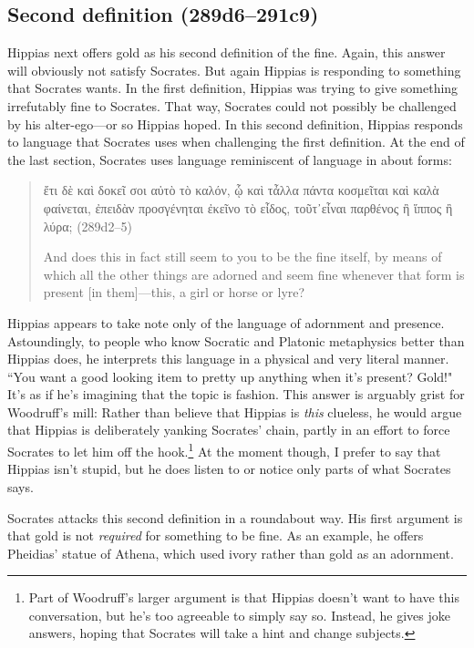 \documentclass[12pt]{article}
\begin{document}

\subsection{Second definition (289d6--291c9)}

Hippias next offers gold as his second definition of the fine.  Again, this answer will obviously not satisfy Socrates.  But again Hippias is responding to something that Socrates wants.  In the first definition, Hippias was trying to give something irrefutably fine to Socrates.  That way, Socrates could not possibly be challenged by his alter-ego---or so Hippias hoped.  In this second definition, Hippias responds to language that Socrates uses when challenging the first definition. At the end of the last section, Socrates uses language reminiscent of language in  about forms:

\begin{quote}
    {\g ἔτι δὲ καὶ δοκεῖ σοι αὐτὸ τὸ καλόν, ᾧ καὶ τἆλλα πάντα κοσμεῖται καὶ καλὰ φαίνεται, ἐπειδὰν προσγένηται ἐκεῖνο τὸ εἶδος, τοῦτ᾽εἶναι παρθένος ἢ ἵππος ἢ λύρα;} (289d2--5)

    And does this in fact still seem to you to be the fine itself, by means of which all the other things are adorned and seem fine whenever that form is present [in them]---this, a girl or horse or lyre?
\end{quote}

Hippias appears to take note only of the language of adornment and presence.  Astoundingly, to people who know Socratic and Platonic metaphysics better than Hippias does, he interprets this language in a physical and very literal manner.  ``You want a good looking item to pretty up anything when it's present?  Gold!"  It's as if he's imagining that the topic is fashion.  This answer is arguably grist for Woodruff's mill: Rather than believe that Hippias is \emph{this} clueless, he would argue that Hippias is deliberately yanking Socrates' chain, partly in an effort to force Socrates to let him off the hook.\footnote{Part of Woodruff's larger argument is that Hippias doesn't want to have this conversation, but he's too agreeable to simply say so.  Instead, he gives joke answers, hoping that Socrates will take a hint and change subjects.}  At the moment though, I prefer to say that Hippias isn't stupid, but he does listen to or notice only parts of what Socrates says.

Socrates attacks this second definition in a roundabout way.  His first argument is that gold is not \emph{required} for something to be fine.  As an example, he offers Pheidias' statue of Athena, which used ivory rather than gold as an adornment.
\end{document}
